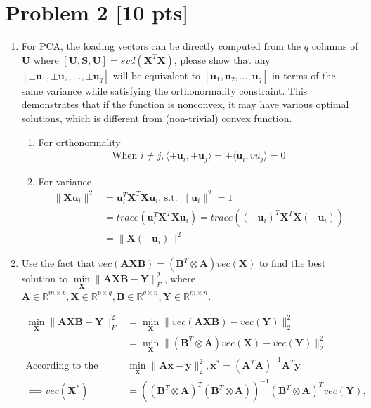 \documentclass[11pt]{article}
\newcommand{\R}{\mathbb{R}}
\newcommand{\mtx}[1]{\mathbf{#1}}
\newcommand{\vct}[1]{\mathbf{#1}}
\def \mA {\mtx{A}}
\def \mB {\mtx{B}}
\def \mU {\mtx{U}}
\def \mS {\mtx{S}}
\def \mX {\mtx{X}}
\def \mY {\mtx{Y}}
\def \vu {\vct{u}}
\def \vx {\vct{x}}
\def \vy {\vct{y}}
\def \R {\mathbb{R}}
\begin{document}
\section{Problem 2 [10 pts]}
\begin{enumerate}
	\item For PCA, the loading vectors can be directly computed from the $q$ columns of  $\mU$ where  $[\mU,\mS,\mU]=svd(\mX^T\mX)$, please show that any $[\pm\vu_1,\pm\vu_2,\dots,\pm\vu_q]$ will be equivalent to $[\vu_1,\vu_2,\dots,\vu_q]$ in terms of the same variance while satisfying the orthonormality constraint. This demonstrates that if the function is nonconvex, it may have various optimal solutions, which is different from (non-trivial) convex function.
	\begin{enumerate}
		\item For orthonormality 
		\begin{align*}
			\text{When } i\neq j, \langle\pm\vu_i,\pm\vu_j\rangle = \pm  \langle\vu_i,vu_j\rangle = 0
		\end{align*}
		\item For variance
		\begin{align*}
			\|\mX\vu_i\|^2 &= \vu_i^T\mX^T\mX\vu_i \text{, s.t. }\|\vu_i\|^2=1\\
			&=trace(\vu_i^T\mX^T\mX\vu_i) = trace((-\vu_i)^T\mX^T\mX(-\vu_i))\\
			& = \|\mX(-\vu_i)\|^2
		\end{align*}
	\end{enumerate}
	\item Use the fact that $vec(\mA\mX\mB)=(\mB^T\otimes\mA)vec(\mX)$ to find the best solution to $\min\limits_{\mX} \|\mA\mX\mB-\mY\|_F^2$, where $\mA\in\R^{m\times p}, \mX\in\R^{p\times q}, \mB\in\R^{q\times n}, \mY\in\R^{m\times n}$.

	\begin{align*}
		\min\limits_{\mX} \|\mA\mX\mB-\mY\|_F^2 &= \min\limits_{\mX} \|vec(\mA\mX\mB)-vec(\mY)\|_2^2\\
		& = \min\limits_{\mX} \|(\mB^T\otimes\mA)vec(\mX)-vec(\mY)\|_2^2\\
		\text{According to the regression model: } & \min_\vx \|\mA\vx-\vy\|^2_2, \vx^* = (\mA^T\mA)^{-1}\mA^T\vy\\
		\implies vec(\mX^*) &= ((\mB^T\otimes\mA)^T(\mB^T\otimes\mA))^{-1}(\mB^T\otimes\mA)^Tvec(\mY), 
	\end{align*}

\end{enumerate}
\newpage
\end{document}
